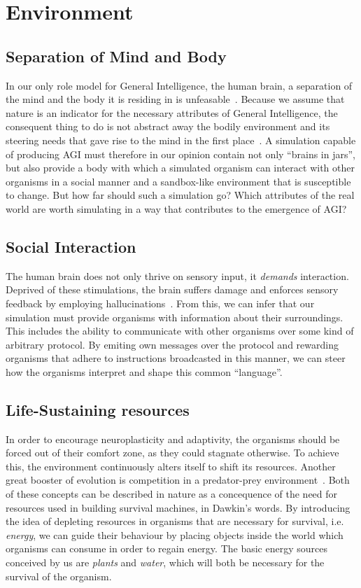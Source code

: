 \section{Environment}

\subsection{Separation of Mind and Body}
In our only role model for General Intelligence, the human brain, a separation of the mind and
the body it is residing in is unfeasable~\cite{Dudai2014}. Because we assume that nature is an 
indicator for the necessary attributes of General Intelligence, the consequent thing to do is not 
abstract away the bodily environment and its steering needs that gave rise to the mind in the first place~\cite{Jekely2010}. 
A simulation capable of producing AGI must therefore in our opinion contain not only ``brains in jars'', but 
also provide a body with which a simulated organism can interact with other organisms in a social manner and a 
sandbox-like environment that is susceptible to change.
But how far should such a simulation go? Which attributes of the real world are worth simulating in a way 
that contributes to the emergence of AGI\@?

\subsection{Social Interaction}
The human brain does not only thrive on sensory input, it
\emph{demands} interaction. Deprived of these stimulations,
the brain suffers damage and enforces sensory feedback by employing
hallucinations~\cite{Grassian2006}. From this, we can infer that
our simulation must provide organisms with information about their surroundings.
This includes the ability to communicate with other organisms over some
kind of arbitrary protocol. By emiting own messages over the protocol and
rewarding organisms that adhere to instructions broadcasted in this manner,
we can steer how the organisms interpret and shape this common ``language''.

\subsection{Life-Sustaining resources}
In order to encourage neuroplasticity and adaptivity, the organisms should be 
forced out of their comfort zone, as they could stagnate otherwise.
To achieve this, the environment continuously alters itself to shift its resources.
Another great booster of evolution is competition in a predator-prey environment~\cite{Dawkins1982}.
Both of these concepts can be described in nature as a concequence of the need for resources 
used in building survival machines, in Dawkin's words. 
By introducing the idea of depleting resources in organisms that are necessary for survival, 
i.e. \emph{energy}, we can guide their behaviour by placing objects inside the world which organisms can consume
in order to regain energy. The basic energy sources conceived by us are \emph{plants} and \emph{water}, which will
both be necessary for the survival of the organism.

